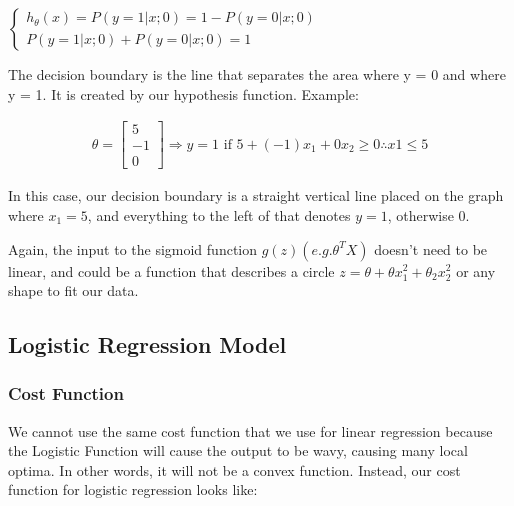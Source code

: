 \documentclass{article}
\begin{document}
            \begin{center}
                $\begin{cases}
                    h_\theta(x) = P(y=1|x;0) = 1 - P(y=0|x;0) \\
                    P(y=1|x;0) + P(y=0|x;0) = 1  
                \end{cases}$
            \end{center}

            The decision boundary is the line that separates the area where y = 0 and where y = 1. 
            It is created by our hypothesis function. Example:

            \begin{align*}
                \theta = 
                \begin{bmatrix}
                    5 \\
                    -1 \\
                    0
                \end{bmatrix} \Longrightarrow y=1 \text{ if } 5 + (-1)x_1 + 0x_2 \geq 0 \therefore x1 \leq 5
            \end{align*}

            In this case, our decision boundary is a straight vertical line placed on the graph where $x_1 = 5$, and everything
            to the left of that denotes $y = 1$, otherwise 0.

            Again, the input to the sigmoid function $g(z) (e.g. \theta^TX)$ doesn't need to be linear, and could be a function that
            describes a circle $z = \theta + \theta x_1^2 + \theta_2x_2^2$ or any shape to fit our data.

            \subsection{Logistic Regression Model}
            
                \subsubsection{Cost Function}

                We cannot use the same cost function that we use for linear regression because the Logistic Function will cause the output to be wavy, 
                causing many local optima. In other words, it will not be a convex function. Instead, our cost function for logistic regression looks like:
            
\end{document}
